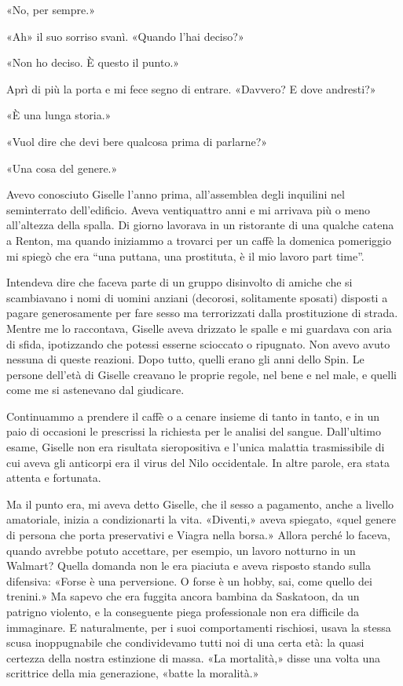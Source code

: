 «No, per sempre.»

«Ah» il suo sorriso svanì. «Quando l'hai deciso?»

«Non ho deciso. È questo il punto.»

Aprì di più la porta e mi fece segno di entrare. «Davvero? E dove
andresti?»

«È una lunga storia.»

«Vuol dire che devi bere qualcosa prima di parlarne?»

«Una cosa del genere.»

\separatorefiori

Avevo conosciuto Giselle l'anno prima, all'assemblea degli inquilini nel
seminterrato dell'edificio. Aveva ventiquattro anni e mi arrivava più o
meno all'altezza della spalla. Di giorno lavorava in un ristorante di
una qualche catena a Renton, ma quando iniziammo a trovarci per un caffè
la domenica pomeriggio mi spiegò che era ``una puttana, una prostituta,
è il mio lavoro part time''.

Intendeva dire che faceva parte di un gruppo disinvolto di amiche che si
scambiavano i nomi di uomini anziani (decorosi, solitamente sposati)
disposti a pagare generosamente per fare sesso ma terrorizzati dalla
prostituzione di strada. Mentre me lo raccontava, Giselle aveva drizzato
le spalle e mi guardava con aria di sfida, ipotizzando che potessi
esserne scioccato o ripugnato. Non avevo avuto nessuna di queste
reazioni. Dopo tutto, quelli erano gli anni dello Spin. Le persone
dell'età di Giselle creavano le proprie regole, nel bene e nel male, e
quelli come me si astenevano dal giudicare.

Continuammo a prendere il caffè o a cenare insieme di tanto in tanto, e
in un paio di occasioni le prescrissi la richiesta per le analisi del
sangue. Dall'ultimo esame, Giselle non era risultata sieropositiva e
l'unica malattia trasmissibile di cui aveva gli anticorpi era il virus
del Nilo occidentale. In altre parole, era stata attenta e fortunata.

Ma il punto era, mi aveva detto Giselle, che il sesso a pagamento, anche
a livello amatoriale, inizia a condizionarti la vita. «Diventi,» aveva
spiegato, «quel genere di persona che porta preservativi e Viagra nella
borsa.» Allora perché lo faceva, quando avrebbe potuto accettare, per
esempio, un lavoro notturno in un Walmart? Quella domanda non le era
piaciuta e aveva risposto stando sulla difensiva: «Forse è una
perversione. O forse è un hobby, sai, come quello dei trenini.» Ma
sapevo che era fuggita ancora bambina da Saskatoon, da un patrigno
violento, e la conseguente piega professionale non era difficile da
immaginare. E naturalmente, per i suoi comportamenti rischiosi, usava la
stessa scusa inoppugnabile che condividevamo tutti noi di una certa età:
la quasi certezza della nostra estinzione di massa. «La mortalità,»
disse una volta una scrittrice della mia generazione, «batte la
moralità.»

